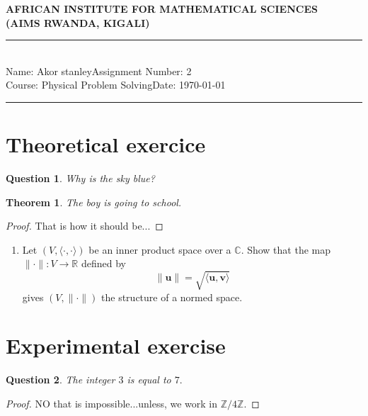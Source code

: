 \documentclass[12pt,a4paper]{article}
\newcommand{\student}{Akor stanley}
\newcommand{\course}{Physical Problem Solving}
\newcommand{\assignment}{2}
\newtheorem{thm}{Theorem}
\newtheorem{quest}{Question}[section]
\newcommand{\Z}{\mathbb{Z}}
\begin{document}
\thispagestyle{empty}
\begin{center}
\textbf{AFRICAN INSTITUTE FOR MATHEMATICAL SCIENCES \\[0.5cm]
(AIMS RWANDA, KIGALI)}
\vspace{1.0cm}
\end{center}

\noindent
\rule{17cm}{0.2cm}\\[0.3cm]
Name: \student \hfill Assignment Number: \assignment\\[0.1cm]
Course: \course \hfill Date: \today\\
\rule{17cm}{0.05cm}
\vspace{1.0cm}

\section{Theoretical exercice}

\begin{quest}

Why is the sky blue?

\end{quest}

\begin{thm}
The boy is going to school.
\end{thm}

\begin{proof}
That is how it should be...
\end{proof}

\begin{enumerate}
\item Let $(V,\langle \cdot,\cdot\rangle)$ be an inner product space over a $\mathbb{C}$. Show that the map $\|\cdot\|:V\rightarrow \mathbb{R}$ defined by 
$$\|\mathbf{u}\| = \sqrt{\langle \mathbf{u},\mathbf{v}\rangle}$$
gives $(V,\|\cdot\|)$ the structure of a normed space.
\end{enumerate}

\section{Experimental exercise }

\begin{quest}
The integer $3$ is equal to $7.$
\end{quest}

\begin{proof}
NO that is impossible...unless, we work in $\Z/4\Z.$
\end{proof}
\end{document}
